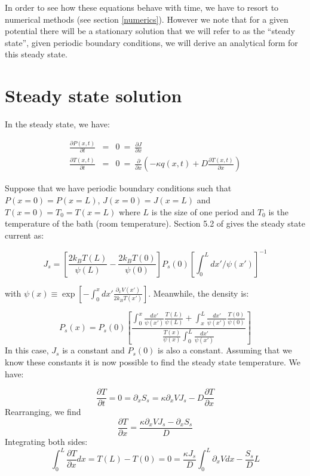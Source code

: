 In order to see how these equations behave with time, we have to resort to numerical methods (see section \ref{numerics}). However we note that for a given potential there will be a stationary solution that we will refer to as the ``steady state'', given periodic boundary conditions, we will derive an analytical form for this steady state.

\section{Steady state solution} \label{SteadyState}
In the steady state, we have:

\begin{eqnarray}
\frac{\partial P(x, t)}{\partial t} &=&  0 \ = \ \frac{\partial J}{\partial x} \label{eqn:SmoluchowskiSteady} \\
\frac{\partial T(x, t)}{\partial t} &=& 0 \ = \ \frac{\partial}{\partial x} \left ( -\kappa q(x, t) + D \frac{\partial T(x, t)}{\partial x} \right ) \label{eqn:TemperatureSteady}
\end{eqnarray}

Suppose that we have periodic boundary conditions such that $P(x = 0) = P(x = L)$,  $J(x = 0) = J(x = L)$ and $T(x = 0) = T_0 = T(x = L)$ where $L$ is the size of one period and $T_0$ is the temperature of the bath (room temperature). Section 5.2 of \cite{Gardiner2009} gives the steady state current as:

\begin{equation}
J_s = \left [\frac{2 k_B T(L)}{\psi(L)} - \frac{2 k_B T(0)}{\psi(0)}  \right] P_s(0) \left [\int_0^L dx'/\psi(x') \right]^{-1}
\label{eqn:SteadyCurrent}
\end{equation}

with $\psi(x) \equiv \exp[-\int_0^x dx' \frac{\partial_x V(x')}{2 k_B T(x')}]$. Meanwhile, the density is:

\begin{equation}
P_s(x) = P_s(0) \left [\frac{\int_0^x \frac{dx'}{\psi(x')} \frac{T(L)}{\psi(L)} + \int_x^L \frac{dx'}{\psi(x')} \frac{T(0)}{\psi(0)} }{\frac{T(x)}{\psi(x)} \int_0^L \frac{dx'}{\psi(x')} } \right]
\label{eqn:SteadyDensity}
\end{equation}
In this case, $J_s$ is a constant and $P_s(0)$ is also a constant. Assuming that we know these constants it is now possible to find the steady state temperature. We have:

\begin{equation}
\frac{\partial T}{\partial t} = 0 =  \partial_x S_s = \kappa \partial_x V J_s - D \frac{\partial T}{\partial x}
\end{equation}
Rearranging, we find
\begin{equation}
\frac{\partial T}{\partial x} = \frac{\kappa \partial_x V J_s - \partial_x S_s}{D}
\end{equation}
Integrating both sides:
\begin{equation}
\int_0^L \frac{\partial T}{\partial x} dx = T(L) - T(0) = 0 = \frac{\kappa J_s}{D} \int_0^L \partial_x V dx - \frac{S_s}{D}L
\end{equation}

